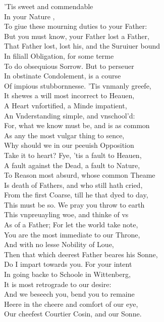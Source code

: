\documentclass[a5paper,DIV=calc,11pt]{scrbook}
\begin{document}
\begin{drama*}
    \kingspeaks 'Tis sweet and commendable\\
    In your Nature \ham,\\
    To giue these mourning duties to your Father:\\
    But you must know, your Father lost a Father,\\
    That Father lost, lost his, and the Suruiuer bound\\
    In filiall Obligation, for some terme\\
    To do obsequious Sorrow. But to perseuer\\
    In obstinate Condolement, is a course\\
    Of impious stubbornnesse. 'Tis vnmanly greefe,\\
    It shewes a will most incorrect to Heauen,\\
    A Heart vnfortified, a Minde impatient,\\
    An Vnderstanding simple, and vnschool'd:\\
    For, what we know must be, and is as common\\
    As any the most vulgar thing to sence,\\
    Why should we in our peeuish Opposition\\
    Take it to heart? Fye, 'tis a fault to Heauen,\\
    A fault against the Dead, a fault to Nature,\\
    To Reason most absurd, whose common Theame\\
    Is death of Fathers, and who still hath cried,\\
    From the first Coarse, till he that dyed to day,\\
    This must be so. We pray you throw to earth\\
    This vnpreuayling woe, and thinke of vs\\
    As of a Father; For let the world take note,\\
    You are the most immediate to our Throne,\\
    And with no lesse Nobility of Loue,\\
    Then that which deerest Father beares his Sonne,\\
    Do I impart towards you. For your intent\\
    In going backe to Schoole in Wittenberg,\\
    It is most retrograde to our desire:\\
    And we beseech you, bend you to remaine\\
    Heere in the cheere and comfort of our eye,\\
    Our cheefest Courtier Cosin, and our Sonne.
    

\end{drama*}
\end{document}
